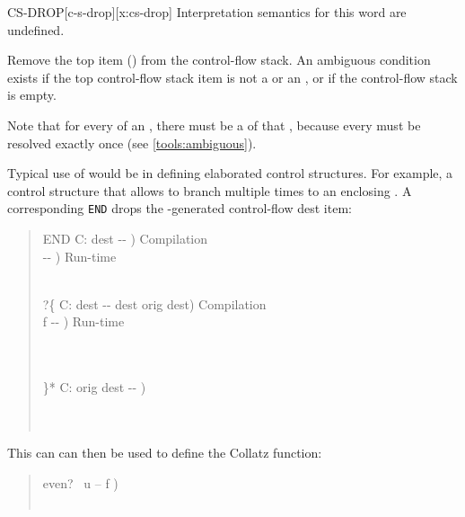 \begin{worddef*}{}{CS-DROP}[c-s-drop][x:cs-drop]
\interpret
	Interpretation semantics for this word are undefined.

\execute

	Remove the top item () from the control-flow stack.
	An ambiguous condition exists if the top control-flow stack item is
	not a  or an , or if the control-flow stack is empty.

	\begin{rationale} %
		Note that for every  of an , there
		must be a  of that , because every
		 must be resolved exactly once (see
		\ref{tools:ambiguous}).
          
		Typical use of  would be in defining elaborated control
		structures.  For example, a control structure that allows to branch multiple
		times to an enclosing .  A corresponding \texttt{END} drops
		the -generated control-flow dest item:

		\begin{quote}\ttfamily
			\word{:} END  C: dest -{}- )  Compilation \\
			\tab[3]  -{}- ) \tab[4.1]  Run-time \\
			\tab {} \\
			\word{;} 

			\word{:} ?\{  C: dest -{}- dest orig dest)  Compilation \\
			\tab[2.4]  f -{}- ) \tab[11.4]  Run-time \\
			\tab {}  \\
			  \\
			\word{;} 

			\word{:} \}*  C: orig dest -{}- ) \\
			\tab {}  \\
			\tab {}  \\
			\word{;} 
		\end{quote}

		This can can then be used to define the Collatz function:

		\begin{quote}\ttfamily
			\word{:} even?\  u -- f ) \\
			   \\
			\word{;}


\end{quote}
\end{rationale}
\end{worddef*}
